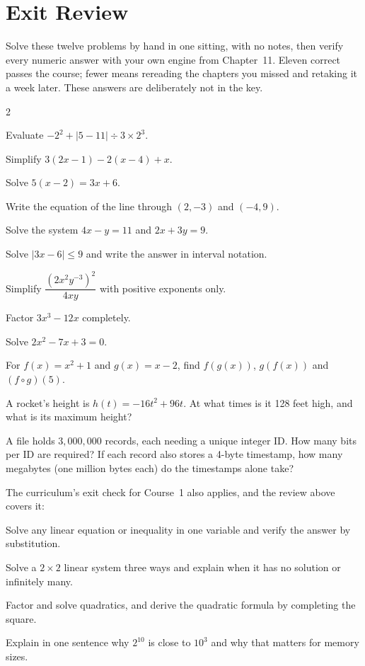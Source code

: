 \chapter*{Exit Review}

Solve these twelve problems by hand in one sitting, with no notes, then verify every numeric answer with your own engine from Chapter~11. Eleven correct passes the course; fewer means rereading the chapters you missed and retaking it a week later. These answers are deliberately not in the key.

\begin{multicols}{2}
\begin{reviewexercises}
\item Evaluate $-2^2 + |5 - 11| \div 3 \times 2^3$.
\item Simplify $3(2x - 1) - 2(x - 4) + x$.
\item Solve $5(x - 2) = 3x + 6$.
\item Write the equation of the line through $(2, -3)$ and $(-4, 9)$.
\item Solve the system $4x - y = 11$ and $2x + 3y = 9$.
\item Solve $|3x - 6| \le 9$ and write the answer in interval notation.
\item Simplify $\dfrac{(2x^2 y^{-3})^2}{4xy}$ with positive exponents only.
\item Factor $3x^3 - 12x$ completely.
\item Solve $2x^2 - 7x + 3 = 0$.
\item For $f(x) = x^2 + 1$ and $g(x) = x - 2$, find $f(g(x))$, $g(f(x))$ and $(f \circ g)(5)$.
\item A rocket's height is $h(t) = -16t^2 + 96t$. At what times is it 128 feet high, and what is its maximum height?
\item A file holds $3{,}000{,}000$ records, each needing a unique integer ID. How many bits per ID are required? If each record also stores a 4-byte timestamp, how many megabytes (one million bytes each) do the timestamps alone take?
\end{reviewexercises}
\end{multicols}

\medskip
The curriculum's exit check for Course~1 also applies, and the review above covers it:

\begin{checklist}
\item Solve any linear equation or inequality in one variable and verify the answer by substitution.
\item Solve a $2 \times 2$ linear system three ways and explain when it has no solution or infinitely many.
\item Factor and solve quadratics, and derive the quadratic formula by completing the square.
\item Explain in one sentence why $2^{10}$ is close to $10^3$ and why that matters for memory sizes.
\end{checklist}
